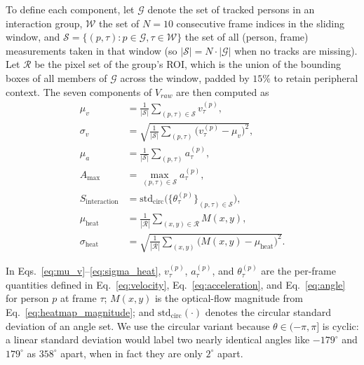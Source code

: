 \documentclass[conference]{IEEEtran}
\begin{document}
\noindent To define each component, let $\mathcal{G}$ denote the set of tracked persons in an interaction group, $\mathcal{W}$ the set of $N = 10$ consecutive frame indices in the sliding window, and $\mathcal{S} = \{(p, \tau) : p \in \mathcal{G}, \tau \in \mathcal{W}\}$ the set of all (person, frame) measurements taken in that window (so $|\mathcal{S}| = N \cdot |\mathcal{G}|$ when no tracks are missing). Let $\mathcal{R}$ be the pixel set of the group's ROI, which is the union of the bounding boxes of all members of $\mathcal{G}$ across the window, padded by $15\%$ to retain peripheral context. The seven components of $V_{raw}$ are then computed as
\begin{subequations}
\label{eq:aggregation}
\begin{align}
\mu_v &= \tfrac{1}{|\mathcal{S}|}\!\!\sum_{(p,\tau)\in\mathcal{S}}\!\! v_\tau^{(p)}, \label{eq:mu_v}\\
\sigma_v &= \sqrt{\tfrac{1}{|\mathcal{S}|}\!\!\sum_{(p,\tau)}\!\! \bigl(v_\tau^{(p)}-\mu_v\bigr)^{2}}, \label{eq:sigma_v}\\
\mu_a &= \tfrac{1}{|\mathcal{S}|}\!\!\sum_{(p,\tau)}\!\! a_\tau^{(p)}, \label{eq:mu_a}\\
A_{\max} &= \!\!\max_{(p,\tau)\in\mathcal{S}}\!\! a_\tau^{(p)}, \label{eq:A_max}\\
S_{\mathrm{interaction}} &= \mathrm{std}_{\mathrm{circ}}\!\bigl(\{\theta_\tau^{(p)}\}_{(p,\tau)\in\mathcal{S}}\bigr), \label{eq:S_int}\\
\mu_{\mathrm{heat}} &= \tfrac{1}{|\mathcal{R}|}\!\!\sum_{(x,y)\in\mathcal{R}}\!\! M(x,y), \label{eq:mu_heat}\\
\sigma_{\mathrm{heat}} &= \sqrt{\tfrac{1}{|\mathcal{R}|}\!\!\sum_{(x,y)}\!\! \bigl(M(x,y)-\mu_{\mathrm{heat}}\bigr)^{2}}. \label{eq:sigma_heat}
\end{align}
\end{subequations}

\noindent In Eqs.~\ref{eq:mu_v}--\ref{eq:sigma_heat}, $v_\tau^{(p)}$, $a_\tau^{(p)}$, and $\theta_\tau^{(p)}$ are the per-frame quantities defined in Eq.~\ref{eq:velocity}, Eq.~\ref{eq:acceleration}, and Eq.~\ref{eq:angle} for person $p$ at frame $\tau$; $M(x, y)$ is the optical-flow magnitude from Eq.~\ref{eq:heatmap_magnitude}; and $\mathrm{std}_{\mathrm{circ}}(\cdot)$ denotes the circular standard deviation of an angle set. We use the circular variant because $\theta \in (-\pi, \pi]$ is cyclic: a linear standard deviation would label two nearly identical angles like $-179^\circ$ and $179^\circ$ as $358^\circ$ apart, when in fact they are only $2^\circ$ apart.
\end{document}
